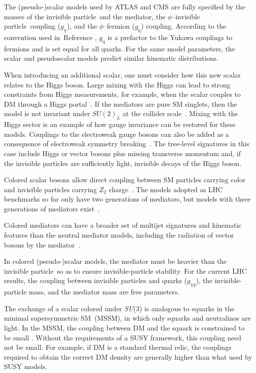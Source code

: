 \documentclass{ar-1col}
\newcommand{\chiDM}{\ensuremath{\chi}\xspace}
\newcommand{\IP}{invisible particle}
\newcommand{\gDM}{\ensuremath{g_{\chiDM}}\xspace}
\newcommand{\gdm}{\gDM}
\newcommand{\gdmq}{\ensuremath{g_{\chiDM q}}\xspace}
\newcommand{\gq}{$g_{\mathrm{q}}$\xspace}
\begin{document}
The (pseudo-)scalar models used by ATLAS and CMS are fully
specified by the masses of the \IP\  and the mediator, the
$\phi$--\IP\  coupling (\gdm), and the $\phi$--fermion (\gq) coupling.
According to the convention used in~Reference , \gq is a
prefactor to the Yukawa couplings to fermions and is set equal for
all quarks. For the same model parameters, the scalar and
pseudoscalar models predict similar kinematic distributions.

When introducing an additional scalar, one must consider how this new
scalar relates to the Higgs boson. Large mixing with the Higgs can
lead to strong constraints from Higgs measurements, for example,
when the scalar couples to DM through a Higgs
portal~\cite{Berlin:2014cfa}. If the mediators are pure SM
singlets, then the model is not invariant under
$SU(2)_L$ at the collider scale~\cite{Bell:2016ekl}. Mixing
with the Higgs sector is an example of how gauge invariance can be restored for these models. 
Couplings to the electroweak
gauge bosons can also be added as a consequence of electroweak
symmetry breaking~\cite{Bauer:2016gys,Englert:2016joy}. The
tree-level signatures in this case include Higgs or vector bosons
plus missing transverse momentum and, if the {\IP}s are
sufficiently light, invisible decays of the Higgs boson.

{Colored scalar bosons} allow direct
coupling between SM particles carrying color and {\IP}s carrying $Z_2$
charge~\cite{Bai:2013iqa, Papucci:2014iwa, An:2013xka,
Bell:2012rg}. The models adopted as LHC benchmarks so far only have two generations of mediators, 
but models with three generations of mediators exist~\cite{Ko:2016zxg}.

Colored mediators can have a broader set of
multijet signatures and kinematic features than the neutral
mediator models, including the radiation of vector bosons by the
mediator~\cite{Bell:2012rg}.

In colored (pseudo-)scalar models, the mediator must be heavier
than the \IP\ so as  to ensure invisible-particle stability. For the current LHC results,
the coupling between {\IP}s and quarks (\gdmq), the invisible-particle  mass, and
the mediator mass are free parameters.

The exchange of a scalar colored under \textit{SU}(3) is analogous to
squarks in the minimal supersymmetric SM\ (MSSM), in which only squarks and neutralinos are light.
In the MSSM, the coupling between DM and the squark is constrained
to be small \cite{Abercrombie:2015wmb}. Without the requirements
of a SUSY framework, this coupling need not be small. For example,
if DM is a standard thermal relic, the couplings required to
obtain the correct DM density are generally higher than
what used by SUSY models. 
\end{document}
